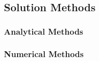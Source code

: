 

\subsection{Solution Methods}


\subsubsection{Analytical Methods}


\subsubsection{Numerical Methods}




